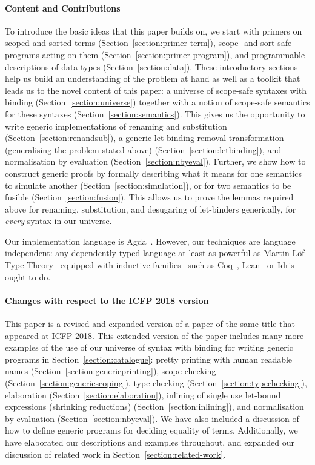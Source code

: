 \paragraph*{Content and Contributions}
To introduce the basic ideas that this paper builds on, we start with
primers on scoped and sorted terms
(Section~\ref{section:primer-term}), scope- and sort-safe programs
acting on them (Section~\ref{section:primer-program}), and
programmable descriptions of data types (Section~\ref{section:data}).
These introductory sections help us build an understanding of the
problem at hand as well as a toolkit that leads us to the novel
content of this paper: a universe of scope-safe syntaxes with binding
(Section~\ref{section:universe}) together with a notion of scope-safe
semantics for these syntaxes (Section~\ref{section:semantics}).  This
gives us the opportunity to write generic implementations of renaming
and substitution (Section~\ref{section:renandsub}), a generic
let-binding removal transformation (generalising the problem stated
above) (Section~\ref{section:letbinding}), and normalisation by
evaluation (Section~\ref{section:nbyeval}). Further, we show how to
construct generic proofs by formally describing what it means for one
semantics to simulate another (Section~\ref{section:simulation}), or
for two semantics to be fusible (Section~\ref{section:fusion}). This
allows us to prove the lemmas required above for renaming,
substitution, and desugaring of let-binders generically, for
\emph{every} syntax in our universe.

\medskip

Our implementation language is
Agda~\cite{norell2009dependently}. However, our techniques are
language independent: any dependently typed language at least as
powerful as Martin-L\"of Type Theory~\cite{martin1982constructive}
equipped with inductive families~\cite{dybjer1994inductive} such as
Coq~\cite{Coq:manual}, Lean~\cite{DBLP:conf/cade/MouraKADR15} or
Idris~\cite{brady2013idris} ought to do.

\medskip

\paragraph*{Changes with respect to the ICFP 2018 version} This paper
is a revised and expanded version of a paper of the same title that
appeared at ICFP 2018. This extended version of the paper includes
many more examples of the use of our universe of syntax with binding
for writing generic programs in Section~\ref{section:catalogue}:
pretty printing with human readable names
(Section~\ref{section:genericprinting}), scope checking
(Section~\ref{section:genericscoping}), type checking
(Section~\ref{section:typechecking}), elaboration
(Section~\ref{section:elaboration}), inlining of single use let-bound
expressions (shrinking reductions) (Section~\ref{section:inlining}),
and normalisation by evaluation (Section~\ref{section:nbyeval}). We
have also included a discussion of how to define generic programs for
deciding equality of terms. Additionally, we have elaborated our
descriptions and examples throughout, and expanded our discussion of
related work in Section~\ref{section:related-work}.

